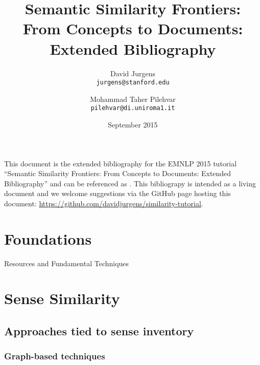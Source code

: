 \documentclass[fullname]{clv2}
\title{Semantic Similarity Frontiers: From Concepts to Documents: Extended Bibliography}
\author{David Jurgens \\ {\tt jurgens@stanford.edu}}
\affil{Stanford University}
\author{Mohammad Taher Pilehvar \\ {\tt pilehvar@di.uniroma1.it}}
\affil{Sapienza University of Rome}
\date{September 2015}
\begin{document}
\maketitle

This document is the extended bibliography for the EMNLP 2015 tutorial ``Semantic Similarity Frontiers: From Concepts
to Documents: Extended Bibliography'' and can be referenced as \cite{jurgens2015semantic}.  This bibliograpy is intended as a living document and we welcome suggestions via the GitHub page hosting this document: \url{https://github.com/davidjurgens/similarity-tutorial}.

\section{Foundations}

Resources and Fundamental Techniques
\begin{enumerate*}
\item \cite{jurafsky2000speech}
\item \cite{manning2008introduction}
\item \cite{turney2010frequency}
\item \cite{tversky1982similarity}
\item \cite{miller1995wordnet}
\item \cite{fellbaum1998wordnet}
\item \cite{hovy2006ontonotes}
\item \cite{bond2012survey}
\item \cite{petrolito2014survey}
\item \cite{gawron2014improving}
\item \cite{Webber:2010:SMI:1852102.1852106}
\end{enumerate*}




\section{Sense Similarity}
\subsection{Approaches tied to sense inventory}

\subsubsection{Graph-based techniques}
\end{document}
